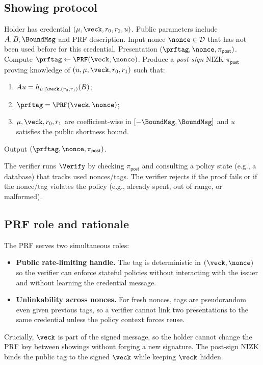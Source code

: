 \subsection{Showing protocol}
\label{subsec:showing-protocol}

\begin{algorithm}[H]
\caption{\(\Show\): ARC presentation (canonical protocol)}
\label{alg:showing}
\begin{algorithmic}[1]
\Require Holder has credential \((\mu,\veck,r_0,r_1,u)\). Public parameters include \(A,B,\BoundMsg\) and PRF description.
\Require Input nonce \(\nonce\in\mathcal{D}\) that has not been used before for this credential.
\Ensure Presentation \((\prftag,\nonce,\pi_{\mathsf{post}})\).
\State Compute \(\prftag\gets \PRF(\veck,\nonce)\).
\State Produce a \emph{post-sign} NIZK \(\pi_{\mathsf{post}}\) proving knowledge of \((u,\mu,\veck,r_0,r_1)\) such that:
\begin{enumerate}[leftmargin=1.6em]
  \item \(A u = h_{\mu\Vert \veck,(r_0,r_1)}(B)\);
  \item \(\prftag = \PRF(\veck,\nonce)\);
  \item \(\mu,\veck,r_0,r_1\) are coefficient-wise in \([-\BoundMsg,\BoundMsg]\) and \(u\) satisfies the public shortness bound.
\end{enumerate}
\State Output \((\prftag,\nonce,\pi_{\mathsf{post}})\).
\end{algorithmic}
\end{algorithm}

The verifier runs \(\Verify\) by checking \(\pi_{\mathsf{post}}\) and consulting a policy state (e.g., a database) that
tracks used nonces/tags. The verifier rejects if the proof fails or if the nonce/tag violates the policy (e.g., already
spent, out of range, or malformed).

\subsection{PRF role and rationale}
The PRF serves two simultaneous roles:
\begin{itemize}[leftmargin=1.25em]
  \item \textbf{Public rate-limiting handle.} The tag is deterministic in \((\veck,\nonce)\) so the verifier can
  enforce stateful policies without interacting with the issuer and without learning the credential message.
  \item \textbf{Unlinkability across nonces.} For fresh nonces, tags are pseudorandom even given previous tags, so a
  verifier cannot link two presentations to the same credential unless the policy context forces reuse.
\end{itemize}
Crucially, \(\veck\) is part of the signed message, so the holder cannot change the PRF key between showings without
forging a new signature. The post-sign NIZK binds the public tag to the signed \(\veck\) while keeping \(\veck\) hidden.

